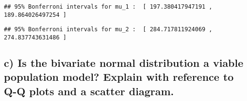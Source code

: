 \documentclass[]{article}
\newenvironment{Shaded}{\begin{snugshade}}{\end{snugshade}}
\newcommand{\KeywordTok}[1]{\textcolor[rgb]{0.13,0.29,0.53}{\textbf{#1}}}
\newcommand{\DecValTok}[1]{\textcolor[rgb]{0.00,0.00,0.81}{#1}}
\newcommand{\StringTok}[1]{\textcolor[rgb]{0.31,0.60,0.02}{#1}}
\newcommand{\NormalTok}[1]{#1}
\begin{document}
\begin{verbatim}
## 95% Bonferroni intervals for mu_1 :  [ 197.380417947191 ,  189.864026497254 ]
\end{verbatim}

\begin{Shaded}
\end{Shaded}

\begin{verbatim}
## 95% Bonferroni intervals for mu_2 :  [ 284.717811924069 ,  274.837743631486 ]
\end{verbatim}

\subsection{c) Is the bivariate normal distribution a viable population
model? Explain with reference to Q-Q plots and a scatter
diagram.}\label{c-is-the-bivariate-normal-distribution-a-viable-population-model-explain-with-reference-to-q-q-plots-and-a-scatter-diagram.}
\end{document}
